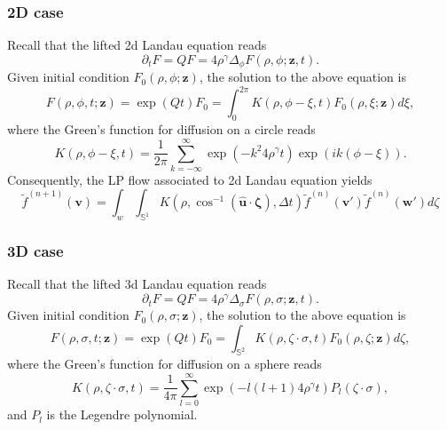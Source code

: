 \documentclass{article}
\numberwithin{equation}{section}
\begin{document}
\subsubsection*{2D case}
Recall that the lifted 2d Landau equation reads
\begin{equation*}
    \partial_{t} F = QF = 4\rho^{\gamma}\Delta_{\phi} F(\rho, \phi;\mathbf{z},t).
\end{equation*}
Given initial condition $F_{0}(\rho, \phi; \mathbf{z})$, the solution to the above equation is
\begin{equation*}
    F(\rho,\phi,t;\mathbf{z}) = \exp(Qt) F_{0}= \int_{0}^{2\pi} K(\rho,\phi-\xi,t)F_{0}(\rho, \xi;\mathbf{z})d\xi,
\end{equation*}
where the Green's function for diffusion on a circle reads
\begin{equation*}
    K(\rho,\phi-\xi,t) = \frac{1}{2\pi} \sum_{k=-\infty}^{\infty} \exp(-k^{2}4\rho^{\gamma}t)\exp(ik(\phi-\xi)).
\end{equation*}
Consequently, the LP flow associated to 2d Landau equation yields
\begin{equation}\label{eq:2dLandau_LP}
    \widetilde{f}^{(n+1)} (\mathbf{v}) = \int_{w}\int_{\mathbb{S}^{1}} K(\rho,\cos^{-1}(\widehat{\mathbf{u}}\cdot \mathbf{\zeta}),\Delta t)\widetilde{f}^{(n)}(\mathbf{v}') \widetilde{f}^{(n)}(\mathbf{w}') d\zeta
\end{equation}


\subsubsection*{3D case}
Recall that the lifted 3d Landau equation reads
\begin{equation*}
    \partial_{t} F = QF = 4\rho^{\gamma}\Delta_{\sigma} F(\rho, \sigma;\mathbf{z},t).
\end{equation*}
Given initial condition $F_{0}(\rho, \sigma; \mathbf{z})$, the solution to the above equation is
\begin{equation*}
    F(\rho, \sigma, t; \mathbf{z}) = \exp(Qt) F_{0}= \int_{\mathbb{S}^{2}}K(\rho,\zeta\cdot\sigma, t)F_{0}(\rho, \zeta;\mathbf{z}) d\zeta,
\end{equation*}
where the Green's function for diffusion on a sphere reads
\begin{equation*}
    K(\rho,\zeta\cdot\sigma, t) = \frac{1}{4\pi}\sum_{l=0}^{\infty} \exp(-l(l+1)4\rho^{\gamma}t)P_{l}(\zeta\cdot\sigma),
\end{equation*}
and $P_{l}$ is the Legendre polynomial.
\end{document}
